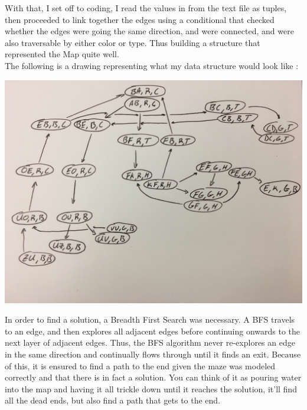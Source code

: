\documentclass[12pt]{article}
\newcommand\tab[1][.5in]{\hspace*{#1}}
\begin{document}
\tab With that, I set off to coding, I read the values in from the text file as tuples, then proceeded to link together the edges using a conditional that checked whether the edges were going the same direction, and were connected, and were also traversable by either color or type. Thus building a structure that represented the Map quite well. \\
\newpage
\tab The following is a drawing representing what my data structure would look like : 
\begin{center}
\includegraphics[scale=0.1]{map}
\end{center}
\tab In order to find a solution, a Breadth First Search was necessary. A BFS travels to an edge, and then explores all adjacent edges before continuing onwards to the next layer of adjacent edges. Thus, the BFS algorithm never re-explores an edge in the same direction and continually flows through until it finds an exit. Because of this, it is ensured to find a path to the end given the maze was modeled correctly and that there is in fact a solution. You can think of it as pouring water into the map and having it all trickle down until it reaches the solution, it'll find all the dead ends, but also find a path that gets to the end.
\newpage
\end{document}
